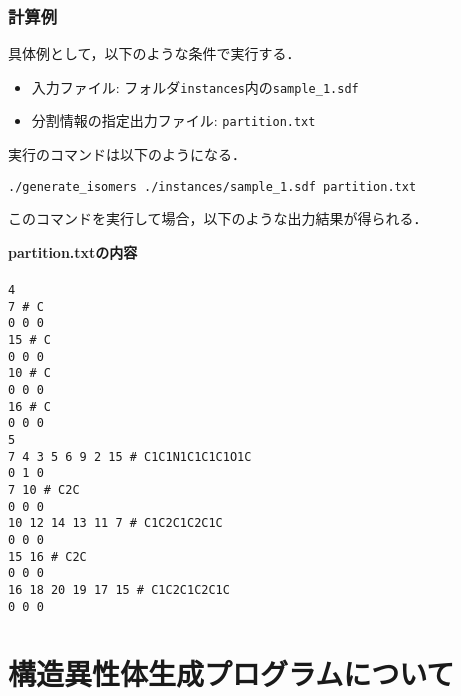 \documentclass[11pt,titlepage,dvipdfmx,twoside]{jarticle}
\begin{document}
\subsubsection{計算例}
\label{sec:instance_p}

具体例として，以下のような条件で実行する．

\begin{itemize}
\item 入力ファイル: フォルダ{\tt instances}内の{\tt sample\_1.sdf}
\item 分割情報の指定出力ファイル: {\tt partition.txt}
\end{itemize}

実行のコマンドは以下のようになる．

\bigskip

{\tt ./generate\_isomers ./instances/sample\_1.sdf partition.txt}

\bigskip

このコマンドを実行して場合，以下のような出力結果が得られる．

\begin{oframed}
{\bf partition.txtの内容}\\\\
{\tt 4 \\
7 \# C \\
0 0 0 \\
15 \# C \\
0 0 0 \\
10 \# C \\
0 0 0 \\
16 \# C \\
0 0 0 \\
5 \\
7 4 3 5 6 9 2 15 \# C1C1N1C1C1C1O1C \\
0 1 0 \\
7 10 \# C2C \\
0 0 0 \\
10 12 14 13 11 7 \# C1C2C1C2C1C \\
0 0 0 \\
15 16 \# C2C \\
0 0 0 \\
16 18 20 19 17 15 \# C1C2C1C2C1C \\
0 0 0 \\}
\end{oframed}

\section{構造異性体生成プログラムについて}
\label{sec: main}
\end{document}
